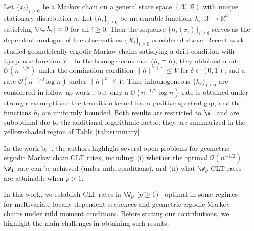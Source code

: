 \documentclass[mnsc,nonblindrev]{informs3}
\begin{document}
Let $\{x_i\}_{i\ge 0}$ be a Markov chain on a general state space $(\mathcal X,\mathcal B)$
with unique stationary distribution $\pi$. Let $\{h_i\}_{i\ge 0}$ be measurable functions
$h_i:\mathcal X\to\mathbb R^d$ satisfying $\E_\pi[h_i]=0$ for all $i\ge 0$.
Then the sequence $\{h_i(x_i)\}_{i\ge 0}$ serves as the dependent analogue of the observations
$\{X_i\}_{i\ge 0}$ considered above. 
Recent work studied geometrically ergodic Markov chains satisfying a drift condition with Lyapunov function $V$~\citep{srikant2024rates}.
 In the homogeneous case ($h_i\equiv h$), they obtained
a rate $\mathcal{O}(n^{-\delta/2})$ under the domination condition $\|h\|^{2+\delta}\le V$ for $\delta\in(0,1)$,
and a rate $\mathcal{O}(n^{-1/2}\log n)$ under $\|h\|^{3}\le V$. Time-inhomogeneous $\{h_i\}_{i\ge 0}$ are considered in follow up work~\citep{wu2025uncertainty}, but only a $\mathcal{O}(n^{-1/2}\log n)$ rate is obtained under
stronger assumptions: the transition kernel has a positive spectral gap, and the functions
$h_i$ are uniformly bounded.
Both results are restricted to $\W_1$ and are suboptimal due to the additional
logarithmic factor; they are summarized in the yellow-shaded region of
Table~\ref{tab:summary}.

In the work by~\cite{srikant2024rates}, the authors highlight several open problems for geometric ergodic Markov chain CLT rates,
including: (i) whether the optimal $\mathcal O(n^{-1/2})$ $\W_1$ rate can
be achieved (under mild conditions), and (ii) what $\W_p$ CLT rates are attainable when $p>1$.

In this work, we establish CLT rates in $\W_p$ ($p\ge 1$)---optimal in some regimes---for
multivariate locally dependent sequences and geometric ergodic Markov chains under mild moment 
conditions. Before stating our contributions, we highlight the main challenges in obtaining
such results.
\end{document}
